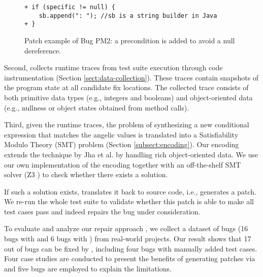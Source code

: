 \begin{figure}[!t]
\centering
\noindent\begin{minipage}{0.45\textwidth}
\begin{lstlisting}
+ if (specific != null) {
    sb.append(": "); //sb is a string builder in Java
+ }
\end{lstlisting}
\end{minipage}
\caption{Patch example of Bug PM2: a precondition is added to avoid a null dereference.}
\label{fig:example-pre}
\end{figure}

Second, \nopol collects runtime traces from test suite execution through code instrumentation (Section \ref{sect:data-collection}). These traces contain snapshots of the program state at all candidate fix locations. The collected trace consists of both primitive data types (e.g., integers and booleans) and object-oriented data (e.g., nullness or object states obtained from method calls). 

Third, given the runtime traces, the problem of synthesizing a new conditional expression that matches the angelic values is translated into a Satisfiability Modulo Theory (SMT) problem (Section \ref{subsect:encoding}).
Our encoding extends the technique by Jha et al. \cite{jha2010oracle} by handling rich object-oriented data.
We use our own implementation of the encoding together with an off-the-shelf SMT solver (Z3 \cite{z3}) to check whether there exists a solution.

If such a solution exists, \nopol translates it back to source code, i.e., generates a patch. We re-run the whole test suite to validate whether this patch is able to make all test cases pass and indeed repairs the bug under consideration.

To evaluate and analyze our repair approach \nopol, we collect a dataset of \numbug bugs (16 bugs with \buggyconditions and 6 bugs with \preconditions) from real-world projects. Our result shows that 17 out of \numbug bugs can be fixed by \nopol, including four bugs with manually added test cases. Four case studies are conducted to present the benefits of generating patches via \nopol and five bugs are employed to explain the limitations. 

